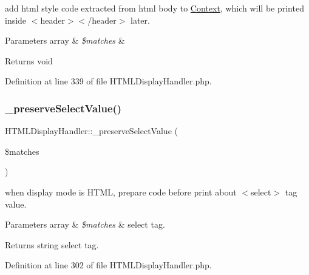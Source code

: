 add html style code extracted from html body to \hyperlink{classContext}{Context}, which will be printed inside $<$header$>$$<$/header$>$ later. 
\begin{DoxyParams}[1]{Parameters}
array & {\em \$matches} & \\
\hline
\end{DoxyParams}
\begin{DoxyReturn}{Returns}
void 
\end{DoxyReturn}


Definition at line 339 of file H\+T\+M\+L\+Display\+Handler.\+php.

\hypertarget{classHTMLDisplayHandler_ab9baa231fb3294a6efcf9062b4ec7b89}{}\label{classHTMLDisplayHandler_ab9baa231fb3294a6efcf9062b4ec7b89} 
\subsubsection{\texorpdfstring{\+\_\+preserve\+Select\+Value()}{\_preserveSelectValue()}}
{\footnotesize\ttfamily H\+T\+M\+L\+Display\+Handler\+::\+\_\+preserve\+Select\+Value (\begin{DoxyParamCaption}\item[{}]{\$matches }\end{DoxyParamCaption})}

when display mode is H\+T\+ML, prepare code before print about $<$select$>$ tag value. 
\begin{DoxyParams}[1]{Parameters}
array & {\em \$matches} & select tag. \\
\hline
\end{DoxyParams}
\begin{DoxyReturn}{Returns}
string select tag. 
\end{DoxyReturn}


Definition at line 302 of file H\+T\+M\+L\+Display\+Handler.\+php.

\hypertarget{classHTMLDisplayHandler_a45d8439c35b8be8f97aeca3fb4e8dd7f}{}\label{classHTMLDisplayHandler_a45d8439c35b8be8f97aeca3fb4e8dd7f} 
